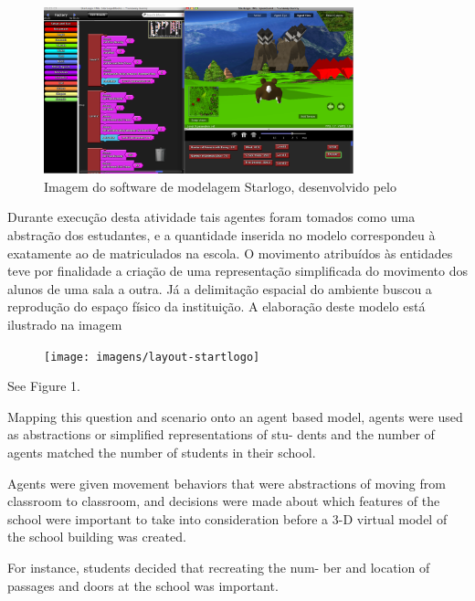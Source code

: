 \begin{figure}[!htb]
  \caption{Imagem do software de modelagem Starlogo, desenvolvido pelo }
  \begin{center}
    \includegraphics[width=0.8\textwidth]{imagens/starlogo}
  \end{center}
  \label{fig:starlogo}
\end{figure}

Durante execução desta atividade tais agentes foram tomados como uma abstração dos estudantes, e a quantidade inserida no modelo correspondeu à exatamente ao de matriculados na escola. O movimento atribuídos às entidades teve por finalidade a criação de uma representação simplificada do movimento dos alunos de uma sala a outra. Já a delimitação espacial do ambiente buscou a reprodução do espaço físico da instituição. A elaboração deste modelo está ilustrado na imagem

\begin{figure}[!htb]
  \caption{}
  \begin{center}
    \texttt{[image: imagens/layout-startlogo]}
  \end{center}
  \label{fig:starlogo}
\end{figure}


See Figure 1.

Mapping this question and scenario onto an agent based model, agents were used as abstractions or simplified representations of stu- dents and the number of agents matched the number of students in their school.

Agents were given movement behaviors that were abstractions of moving from classroom to classroom, and decisions were made about which features of the school were important to take into consideration before a 3-D virtual model of the school building was created.

For instance, students decided that recreating the num- ber and location of passages and doors at the school was important.

